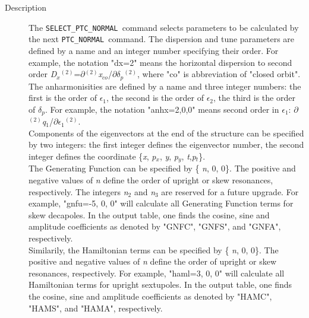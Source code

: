 \begin{description}
   \item[Description] 
     The \texttt{SELECT\_PTC\_NORMAL }command selects parameters to be
     calculated by the next \texttt{PTC\_NORMAL }command. The dispersion
     and tune parameters are defined by a name and an integer number
     specifying their order. For example, the notation "dx=2" means the
     horizontal dispersion to second order
     \textit{D$_x$}$^{(2)}$=$\partial$$^{(2)}$\textit{x}$_{co}$/$\partial$\textit{$\delta$}$_\textit{p}$$^{(2)}$, 
     where "co" is abbreviation of "closed orbit". The anharmonisities
     are defined by a name and three integer numbers: the first is the
     order of \textit{$\epsilon$}$_1$, the second is the order of
     \textit{$\epsilon$}$_2$, the third is the order of
     \textit{\nolinebreak$\delta$}$_\textit{p}$. For example, the
     notation "anhx=2,0,0" means second order in
     \textit{$\epsilon$}$_1$:
     $\partial$$^{(2)}$\textit{q}$_1$/$\partial$\textit{$\epsilon$}$_1$$^{(2)}$.  \\       
     Components of the eigenvectors at the end of the structure can be
     specified by two integers: the first integer defines the
     eigenvector number, the second integer defines the coordinate
     \{\textit{x}, \textit{p$_x$}, \textit{y}, \textit{p$_y$},
     \textit{t},\textit{p$_t$}\}. \\
     The Generating Function can be specified by \{ \textit{n}, 0,
     0\}. The positive and negative values of \textit{n} define the
     order of upright or skew resonances, respectively. The integers
     \textit{n}$_2$ and \textit{n}$_3$ are reserved for a future
     upgrade. For example, "gnfu=-5, 0, 0" will calculate all Generating
     Function terms for skew decapoles. In the output table, one finds
     the cosine, sine and amplitude coefficients as denoted by "GNFC",
     "GNFS", and "GNFA", respectively. \\
     Similarily, the Hamiltonian terms can be specified by \{
     \textit{n}, 0, 0\}. The positive and negative values of \textit{n}
     define the order of upright or skew resonances, respectively. For
     example, "haml=3, 0, 0" will calculate all Hamiltonian terms for
     upright sextupoles. In the output table, one finds the cosine, sine
     and amplitude coefficients as denoted by "HAMC", "HAMS", and
     "HAMA", respectively. 
\end{description}

